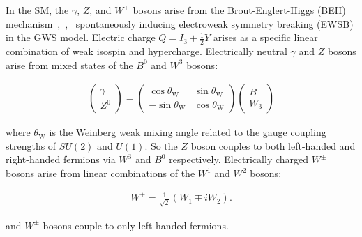In the SM, the $\gamma$, $Z$, and $W^\pm$ bosons arise from the Brout-Englert-Higgs (BEH) mechanism~\cite{HIGGS1964132},~\cite{PhysRevLett.13.508},~\cite{PhysRevLett.13.321} spontaneously inducing electroweak symmetry breaking (EWSB) in the GWS model.
Electric charge $Q = I_3 + \frac{1}{2} Y$ arises as a specific linear combination of weak isospin and hypercharge.
Electrically neutral $\gamma$ and $Z$ bosons arise from mixed states of the $B^0$ and $W^3$ bosons:
\begin{linenomath*}
\begin{align}
\left(\begin{array}{c}
\gamma \\
Z^0
\end{array}\right)=\left(\begin{array}{cc}
\cos \theta_{\mathrm{W}} & \sin \theta_{\mathrm{W}} \\
-\sin \theta_{\mathrm{W}} & \cos \theta_{\mathrm{W}}
\end{array}\right)\left(\begin{array}{c}
B \\
W_3
\end{array}\right)
\label{}
\end{align}
\end{linenomath*}
where $\theta_{\mathrm{W}}$ is the Weinberg weak mixing angle related to the gauge coupling strengths of $SU(2)$ and $U(1)$.
So the $Z$ boson couples to both left-handed and right-handed fermions via $W^3$ and $B^0$ respectively.
Electrically charged $W^\pm$ bosons arise from linear combinations of the $W^1$ and $W^2$ bosons:
\begin{linenomath*}
\begin{align}
W^{\pm}=\frac{1}{\sqrt{2}}\left(W_1 \mp i W_2\right).
\end{align}
\end{linenomath*}
and $W^\pm$ bosons couple to only left-handed fermions.

